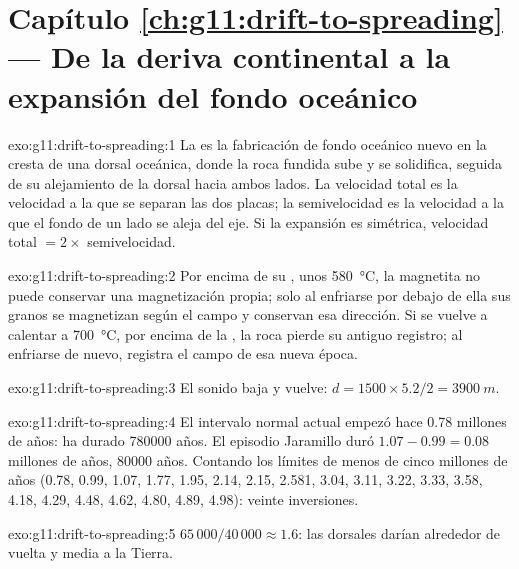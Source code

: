 \section*{Capítulo \ref{ch:g11:drift-to-spreading} --- De la deriva continental a la expansión del fondo oceánico}

\begin{solution}{exo:g11:drift-to-spreading:1}
La  es la fabricación de fondo oceánico nuevo en
la cresta de una dorsal oceánica, donde la roca fundida sube y se solidifica,
seguida de su alejamiento de la dorsal hacia ambos lados. La velocidad total
es la velocidad a la que se separan las dos placas; la semivelocidad es la
velocidad a la que el fondo de un lado se aleja del eje. Si la expansión es
simétrica, velocidad total $= 2
\times$ semivelocidad.
\end{solution}

\begin{solution}{exo:g11:drift-to-spreading:2}
Por encima de su , unos \qty{580}{\celsius}, la
magnetita no puede conservar una magnetización propia; solo al enfriarse por
debajo de ella sus granos se magnetizan según el campo y conservan esa
dirección. Si se vuelve a calentar a \qty{700}{\celsius}, por encima de la
, la roca pierde su antiguo registro; al enfriarse de
nuevo, registra el campo de esa nueva época.
\end{solution}

\begin{solution}{exo:g11:drift-to-spreading:3}
El sonido baja y vuelve: $d = 1500 \times 5.2/2 = \qty{3900}{m}$.
\end{solution}

\begin{solution}{exo:g11:drift-to-spreading:4}
El intervalo normal actual empezó hace \num{0.78} millones de años: ha durado
\num{780000} años. El episodio Jaramillo duró $1.07 - 0.99 = \num{0.08}$
millones de años, \num{80000} años. Contando los límites de menos de cinco
millones de años (0.78, 0.99, 1.07, 1.77, 1.95, 2.14, 2.15, 2.581, 3.04, 3.11,
3.22, 3.33, 3.58, 4.18, 4.29, 4.48, 4.62, 4.80, 4.89, 4.98): veinte inversiones.
\end{solution}

\begin{solution}{exo:g11:drift-to-spreading:5}
$65\,000/40\,000 \approx 1.6$: las dorsales darían alrededor de vuelta y
media a la Tierra.
\end{solution}

